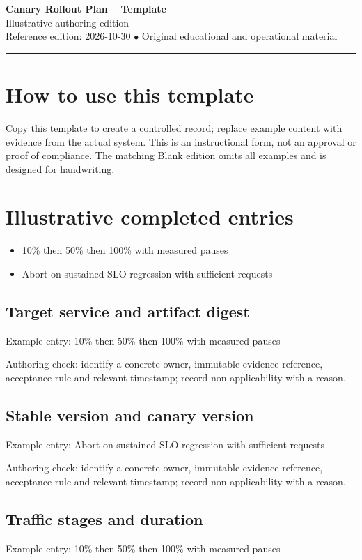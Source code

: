 \documentclass[10pt,letterpaper]{article}
\begin{document}
\begin{center}
{\LARGE\bfseries\color{cdblue}Canary Rollout Plan -- Template}\\[7pt]
{\large Illustrative authoring edition}\\[6pt]
{\small Reference edition: 2026-10-30 $\bullet$ Original educational and operational material}
\end{center}
\noindent\color{cdblue}\rule{\linewidth}{1.2pt}\color{black}
\vspace{0.4em}
\section{How to use this template}
Copy this template to create a controlled record; replace example content with evidence from the actual system. This is an instructional form, not an approval or proof of compliance. The matching Blank edition omits all examples and is designed for handwriting.


\section{Illustrative completed entries}
\begin{itemize}
\item 10\% then 50\% then 100\% with measured pauses
\item Abort on sustained SLO regression with sufficient requests
\end{itemize}

\subsection{Target service and artifact digest}
Example entry: 10\% then 50\% then 100\% with measured pauses

Authoring check: identify a concrete owner, immutable evidence reference, acceptance rule and relevant timestamp; record non-applicability with a reason.


\subsection{Stable version and canary version}
Example entry: Abort on sustained SLO regression with sufficient requests

Authoring check: identify a concrete owner, immutable evidence reference, acceptance rule and relevant timestamp; record non-applicability with a reason.


\subsection{Traffic stages and duration}
Example entry: 10\% then 50\% then 100\% with measured pauses
\end{document}

